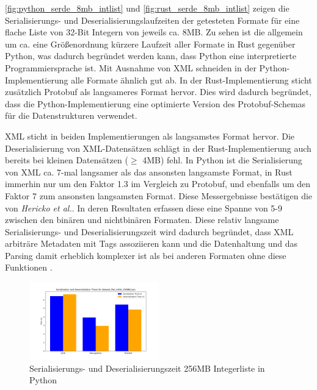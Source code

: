 \documentclass[ngerman]{seminarvorlage}
\begin{document}
\autoref{fig:python_serde_8mb_intlist} und \autoref{fig:rust_serde_8mb_intlist} zeigen die Serialisierungs- und Deserialisierungslaufzeiten der getesteten Formate für eine flache Liste von 32-Bit Integern von jeweils ca. 8MB. Zu sehen ist die allgemein um ca. eine Größenordnung kürzere Laufzeit aller Formate in Rust gegenüber Python, was dadurch begründet werden kann, dass Python eine interpretierte Programmiersprache ist. Mit Ausnahme von XML schneiden in der Python-Implementierung alle Formate ähnlich gut ab. In der Rust-Implementierung sticht zusätzlich Protobuf als langsameres Format hervor. Dies wird dadurch begründet, dass die Python-Implementierung eine optimierte Version des Protobuf-Schemas für die Datenstrukturen verwendet. 

XML sticht in beiden Implementierungen als langsamstes Format hervor. Die Deserialisierung von XML-Datensätzen schlägt in der Rust-Implementierung auch bereits bei kleinen Datensätzen ($\ge$ 4MB) fehl. In Python ist die Serialisierung von XML ca. 7-mal langsamer als das ansonsten langsamste Format, in Rust immerhin nur um den Faktor 1.3 im Vergleich zu Protobuf, und ebenfalls um den Faktor 7 zum ansonsten langsamsten Format. Diese Messergebnisse bestätigen die von \textit{Hericko et al.}. In deren Resultaten erfassen diese eine Spanne von 5-9 \cite[ Kapitel 5]{10.1145/944579.944589} zwischen den binären und nichtbinären Formaten. Diese relativ langsame Serialisierungs- und Deserialisierungszeit wird dadurch begründet, dass XML arbiträre Metadaten mit Tags assoziieren kann und die Datenhaltung und das Parsing damit erheblich komplexer ist als bei anderen Formaten ohne diese Funktionen \cite[Kapitel 4.1]{10.1145/944579.944589}.

\begin{figure}[h]
  \centering
  \includegraphics[width=0.5\textwidth]{images/graphs/python_dataset_flat_intlist_256MB_json_combined_times.png}
  \caption{Serialisierungs- und Deserialisierungszeit 256MB Integerliste in Python}
  \label{fig:python_serde_256mb_intlist}
\end{figure}
\end{document}
